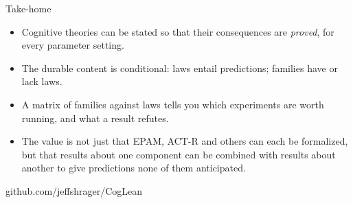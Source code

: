 \documentclass[aspectratio=169,11pt]{beamer}
\begin{document}
\begin{frame}{Take-home}
  \begin{itemize}
    \item Cognitive theories can be stated so that their consequences are \emph{proved}, for every parameter setting.
    \item The durable content is conditional: laws entail predictions; families have or lack laws.
    \item A matrix of families against laws tells you which experiments are worth running, and what a result refutes.
    \item The value is not just that EPAM, ACT-R and others can each be formalized, but that results about one component can be combined with results about another to give predictions none of them anticipated.
  \end{itemize}
  \bigskip
  \centering\small github.com/jeffshrager/CogLean
\end{frame}
\end{document}
